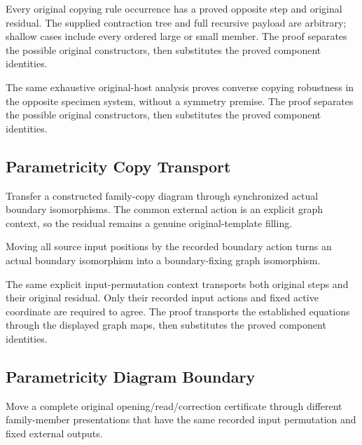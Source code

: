 Every original copying rule occurrence has a proved opposite step and
original residual. The supplied contraction tree and full recursive payload
are arbitrary; shallow cases include every ordered large or small member.
The proof separates the possible original constructors, then substitutes the proved component identities.
\par{}

The same exhaustive original-host analysis proves converse copying
robustness in the opposite specimen system, without a symmetry premise.
The proof separates the possible original constructors, then substitutes the proved component identities.
\par{}

\subsection{Parametricity Copy Transport}
Transfer a constructed family-copy diagram through synchronized actual
boundary isomorphisms. The common external action is an explicit graph
context, so the residual remains a genuine original-template filling.

Moving all source input positions by the recorded boundary action turns
an actual boundary isomorphism into a boundary-fixing graph isomorphism.
\par{}

The same explicit input-permutation context transports both original
steps and their original residual. Only their recorded input actions and
fixed active coordinate are required to agree.
The proof transports the established equations through the displayed graph maps, then substitutes the proved component identities.
\par{}

\subsection{Parametricity Diagram Boundary}
Move a complete original opening/read/correction certificate through
different family-member presentations that have the same recorded input
permutation and fixed external outputs.

